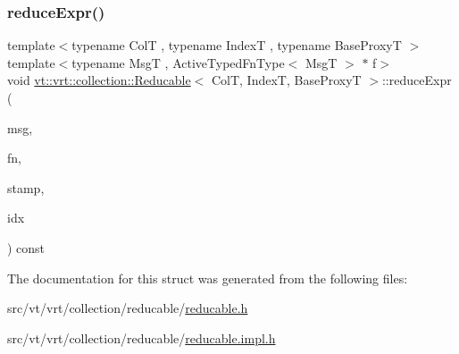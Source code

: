 \subsubsection{\texorpdfstring{reduce\+Expr()}{reduceExpr()}\hspace{0.1cm}{\footnotesize\ttfamily [2/2]}}
{\footnotesize\ttfamily template$<$typename ColT , typename IndexT , typename Base\+ProxyT $>$ \\
template$<$typename MsgT , Active\+Typed\+Fn\+Type$<$ Msg\+T $>$ $\ast$ f$>$ \\
void \hyperlink{structvt_1_1vrt_1_1collection_1_1_reducable}{vt\+::vrt\+::collection\+::\+Reducable}$<$ ColT, IndexT, Base\+ProxyT $>$\+::reduce\+Expr (\begin{DoxyParamCaption}\item[{MsgT $\ast$const}]{msg,  }\item[{\hyperlink{structvt_1_1vrt_1_1collection_1_1_reducable_a9f5a6c385efafe1fa52937f4809a9486}{Reduce\+Idx\+Func\+Type}}]{fn,  }\item[{\hyperlink{structvt_1_1vrt_1_1collection_1_1_reducable_a19f80baf23f36dad4948ef07322fd0cb}{Reduce\+Stamp}}]{stamp,  }\item[{IndexT const \&}]{idx }\end{DoxyParamCaption}) const}



The documentation for this struct was generated from the following files\+:\begin{DoxyCompactItemize}
\item 
src/vt/vrt/collection/reducable/\hyperlink{reducable_8h}{reducable.\+h}\item 
src/vt/vrt/collection/reducable/\hyperlink{reducable_8impl_8h}{reducable.\+impl.\+h}\end{DoxyCompactItemize}
